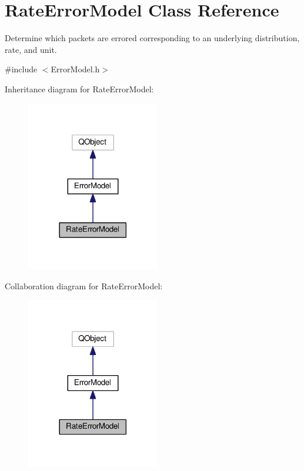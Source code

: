 \hypertarget{classRateErrorModel}{}\section{Rate\+Error\+Model Class Reference}
\label{classRateErrorModel}


Determine which packets are errored corresponding to an underlying distribution, rate, and unit.  




{\ttfamily \#include $<$Error\+Model.\+h$>$}



Inheritance diagram for Rate\+Error\+Model\+:\nopagebreak
\begin{figure}[H]
\begin{center}
\leavevmode
\includegraphics[width=165pt]{classRateErrorModel__inherit__graph}
\end{center}
\end{figure}


Collaboration diagram for Rate\+Error\+Model\+:\nopagebreak
\begin{figure}[H]
\begin{center}
\leavevmode
\includegraphics[width=165pt]{classRateErrorModel__coll__graph}
\end{center}
\end{figure}
